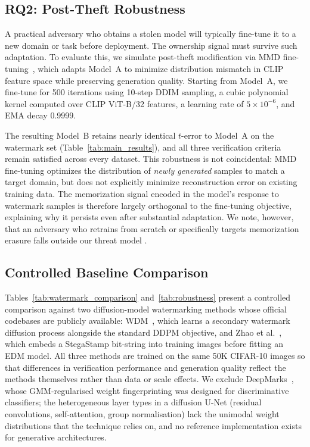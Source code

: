 \documentclass{article}
\begin{document}
\subsection{RQ2: Post-Theft Robustness}
\label{sec:theft}

A practical adversary who obtains a stolen model will typically fine-tune it to a new domain or task before deployment. The ownership signal must survive such adaptation. To evaluate this, we simulate post-theft modification via MMD fine-tuning~\citep{gretton2012kernel}, which adapts Model~A to minimize distribution mismatch in CLIP feature space while preserving generation quality. Starting from Model~A, we fine-tune for 500 iterations using 10-step DDIM sampling, a cubic polynomial kernel computed over CLIP ViT-B/32 features, a learning rate of $5{\times}10^{-6}$, and EMA decay 0.9999.

The resulting Model~B retains nearly identical $t$-error to Model~A on the watermark set (Table~\ref{tab:main_results}), and all three verification criteria remain satisfied across every dataset. This robustness is not coincidental: MMD fine-tuning optimizes the distribution of \emph{newly generated} samples to match a target domain, but does not explicitly minimize reconstruction error on existing training data. The memorization signal encoded in the model's response to watermark samples is therefore largely orthogonal to the fine-tuning objective, explaining why it persists even after substantial adaptation. We note, however, that an adversary who retrains from scratch or specifically targets memorization erasure falls outside our threat model .

\subsection{Controlled Baseline Comparison}
\label{sec:baseline_comparison}

Tables~\ref{tab:watermark_comparison} and~\ref{tab:robustness} present
a controlled comparison against two diffusion-model watermarking
methods whose official codebases are publicly available:
WDM~\citep{peng2023watermark}, which learns a secondary watermark
diffusion process alongside the standard DDPM objective, and Zhao
et al.~\citep{zhao2023recipe}, which embeds a StegaStamp bit-string
into training images before fitting an EDM model.  All three methods
are trained on the same 50K CIFAR-10 images so that differences in
verification performance and generation quality reflect the methods
themselves rather than data or scale effects.  We exclude
DeepMarks~\citep{chen2019deepmarks}, whose GMM-regularised weight
fingerprinting was designed for discriminative classifiers; the
heterogeneous layer types in a diffusion U-Net (residual convolutions,
self-attention, group normalisation) lack the unimodal weight
distributions that the technique relies on, and no reference
implementation exists for generative architectures.
\end{document}
